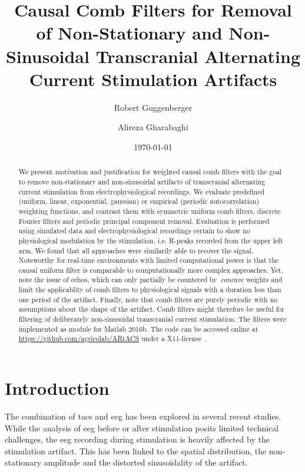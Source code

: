 \documentclass[a4paper]{article}
\title{Causal Comb Filters for Removal of Non-Stationary and Non-Sinusoidal Transcranial Alternating Current Stimulation Artifacts}
\author[1,*]{Robert Guggenberger}
\author[1]{Alireza Gharabaghi}
\affil[1]{Department for Translational Neurosurgery, University Hospital Tübingen}
\affil[*]{Corresponding author: \email{robert.guggenberger@posteo.eu}}
\date{\today}
\begin{document}
\maketitle
\thispagestyle{fancy}

\begin{abstract}
We present motivation and justification for weighted causal comb filters with the goal to remove non-stationary and non-sinusoidal artifacts of transcranial alternating current stimulation from electrophysiological recordings.
We evaluate predefined (uniform, linear, exponential, gaussian) or empirical (periodic autocorrelation) weighting functions, and contrast them with symmetric uniform comb filters, discrete Fourier filters and periodic principal component removal.
Evaluation is performed using simulated data and electrophysiological recordings certain to show no physiological modulation by the stimulation, i.e. R-peaks recorded from the upper left arm.
We found that all approaches were similarily able to recover the signal. Noteworthy for real-time environments with limited computational power is that the causal uniform filter is comparable to computationally more complex approaches.
Yet, note the issue of echos, which can only partially be countered by~\emph{concave} weights and limit the applicablity of comb filters to physiological signals with a duration less than one period of the artifact.
Finally, note that comb filters are purely periodic with no assumptions about the shape of the artifact. Comb filters might therefore be useful for filtering of deliberately non-sinusoidal transcranial current stimulation.
The filters were implemented as module for Matlab 2016b. The code can be accessed online at \url{https://github.com/agricolab/ARtACS} under a X11-license~\citep{Guggenberger2017}.

\end{abstract}

\section{Introduction}

The combination of \gls{tacs} and \gls{eeg} has been explored in several recent studies. While the analysis of \gls{eeg} before or after stimulation posits limited technical challenges, the \gls{eeg} recording during stimulation is heavily affected by the stimulation artifact. This has been linked to the spatial distribution, the non-stationary amplitude and the distorted sinusoidality of the artifact.
\end{document}
